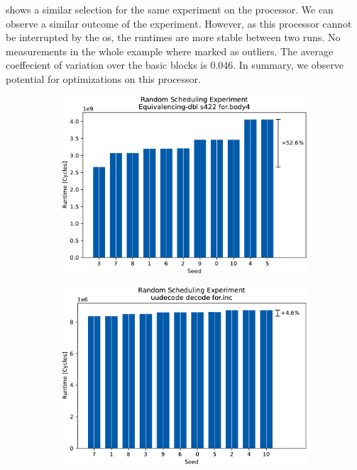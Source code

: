  shows a similar selection for the same experiment on the \aurora processor.
We can observe a similar outcome of the experiment.
However, as this processor cannot be interrupted by the \ac{os}, the runtimes are more stable between two runs.
No measurements in the whole example where marked as outliers.
The average coeffecient of variation over the basic blocks is 0.046.
In summary, we observe potential for optimizations on this processor.
\begin{figure}
    \begin{subfigure}{0.0325\textwidth}\caption{}\label{fig:eval:rndm:aurora:a}\end{subfigure}
    \begin{subfigure}{0.44\textwidth}
        \includegraphics[width=\textwidth]{img/random-scheduling-experiment-aurora-collected/Equivalencing-dbl-crop.pdf}
    \end{subfigure}
    \hfill
    \begin{subfigure}{0.0325\textwidth}\caption{}\label{fig:eval:rndm:aurora:b}\end{subfigure}
    \begin{subfigure}{0.44\textwidth}
        \includegraphics[width=\textwidth]{img/random-scheduling-experiment-aurora-collected/uudecode-crop.pdf}
    \end{subfigure}


\end{figure}
